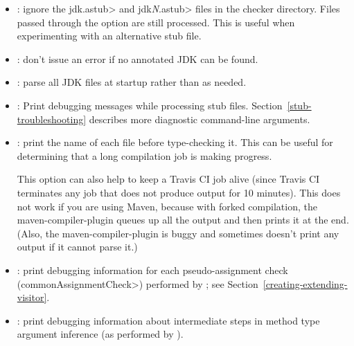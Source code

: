 \begin{itemize}

\item {}:
  ignore the \<jdk.astub> and \<jdk\emph{N}.astub> files in the checker directory. Files passed
  through the  option are still processed. This is useful
  when experimenting with an alternative stub file.

\item {}:
  don't issue an error if no annotated JDK can be found.

\item {}:
  parse all JDK files at startup rather than as needed.

\item {}:
  Print debugging messages while processing stub files.
  Section~\ref{stub-troubleshooting} describes more diagnostic command-line
  arguments.

\end{itemize}


\begin{itemize}

\item {}: print the name of each file before type-checking it.
This can be useful for determining that a long compilation job is making
progress.

This option can also help to keep a Travis CI job alive (since Travis CI
terminates any job that does not produce output for 10 minutes).
This does not work if you are using Maven, because with forked compilation,
the maven-compiler-plugin queues up all the output and then prints it at the end.
(Also, the maven-compiler-plugin is buggy and sometimes doesn't print any
output if it cannot parse it.)

\item {}: print debugging information for each
pseudo-assignment check (\<commonAssignmentCheck>) performed by
; see
Section~\ref{creating-extending-visitor}.

\item {}: print debugging information
about intermediate steps in method type argument inference
(as performed by ).

\end{itemize}

